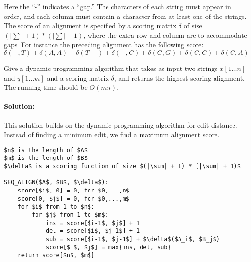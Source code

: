 \documentclass[12pt]{article}
\newcommand{\BigO}[1]{\ensuremath{O(#1)}}
\begin{document}
Here the ``-'' indicates a ``gap.'' The characters of each string must appear
in order, and each column must contain a character from at least one of 
the strings. The score of an alignment is specified by a scoring matrix
$\delta$
of size $(|\sum| + 1) * (|\sum| + 1)$, where the extra row and column are to
accommodate gaps. For instance the preceding alignment has the following score:
$$\delta(-, T ) + \delta(A, A) + \delta(T, -) + \delta(-, C) + \delta(G,
G) + \delta(C, C) + \delta(C, A)$$

Give a dynamic programming algorithm that takes as input two strings
$x[1 \dots n]$ and $y[1 \dots m]$ and a scoring matrix $\delta$, and returns
the highest-scoring alignment. The running time should be $\BigO{mn}$.

\paragraph{Solution:}
This solution builds on the dynamic programming algorithm for edit
distance. Instead of finding a minimum edit, we find a maximum
alignment score.
\begin{lstlisting}[mathescape]
$n$ is the length of $A$
$m$ is the length of $B$
$\delta$ is a scoring function of size $(|\sum| + 1) * (|\sum| + 1)$

SEQ_ALIGN($A$, $B$, $\delta$):
    score[$i$, 0] = 0, for $0,...,n$
    score[0, $j$] = 0, for $0,...,m$
    for $i$ from 1 to $n$:
        for $j$ from 1 to $m$:
            ins = score[$i-1$, $j$] + 1
            del = score[$i$, $j-1$] + 1
            sub = score[$i-1$, $j-1$] + $\delta$($A_i$, $B_j$)
            score[$i$, $j$] = max{ins, del, sub}
    return score[$n$, $m$]
\end{lstlisting}
\end{document}
